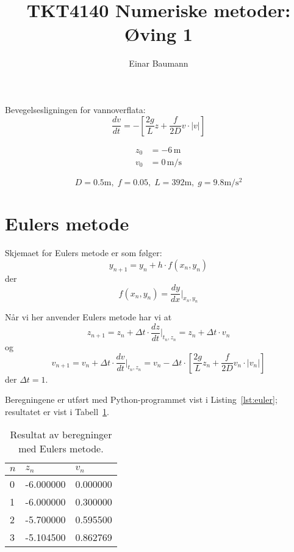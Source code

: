



\title{TKT4140 Numeriske metoder: Øving 1}
\author{Einar Baumann}


\maketitle
\pagebreak

Bevegelsesligningen for vannoverflata:
\begin{equation}
  \frac{dv}{dt} = - \left[ \frac{2g}{L}z + \frac{f}{2D}v \cdot |v| \right]
  \label{eq:main}
\end{equation}

\begin{align*}
  z_0 & = -6\, \mathrm{m} \\
  v_0 & = 0\, \mathrm{m/s}
\end{align*}

\begin{equation*}
  D=0.5 \mathrm{m},\; f=0.05, \; L=392 \mathrm{m}, \; g=9.8 \mathrm{m/s^2}
\end{equation*}


\section{Eulers metode} %
\label{sec:eulers_metode}
Skjemaet for Eulers metode er som følger:
\begin{equation}
  y_{n+1} = y_n + h\cdot f(x_n,y_n)
\end{equation}
der
\begin{equation}
  f(x_n,y_n) = \frac{dy}{dx}\bigg|_{x_n,y_n}
\end{equation}

\noindent Når vi her anvender Eulers metode har vi at
\begin{equation}
  z_{n+1} = z_n + \Delta t \cdot \frac{dz}{dt}\bigg|_{t_n,z_n} = 
    z_n + \Delta t \cdot v_n
\end{equation}
og
\begin{equation}
  v_{n+1} = v_n + \Delta t \cdot \frac{dv}{dt}\bigg|_{t_n,z_n} = 
    v_n - \Delta t \cdot \left[ \frac{2g}{L}z_n + \frac{f}{2D}v_n \cdot |v_n| \right]
\end{equation}
der $\Delta t = 1$.

Beregningene er utført med Python-programmet vist i Listing~\ref{lst:euler}; resultatet er vist i Tabell~\ref{tab:euler}.

\begin{table}[H]
  \centering
  \caption{Resultat av beregninger med Eulers metode.}
  \label{tab:euler}
  \begin{tabularx}{0.6\textwidth}{XXX}
    \toprule
    $n$ & $z_n$  & $v_n$ \\
    \midrule
    0 &-6.000000 & 0.000000 \\
    1 &-6.000000 & 0.300000 \\
    2 &-5.700000 & 0.595500 \\
    3 &-5.104500 & 0.862769 \\
    \bottomrule
  \end{tabularx}
\end{table}


